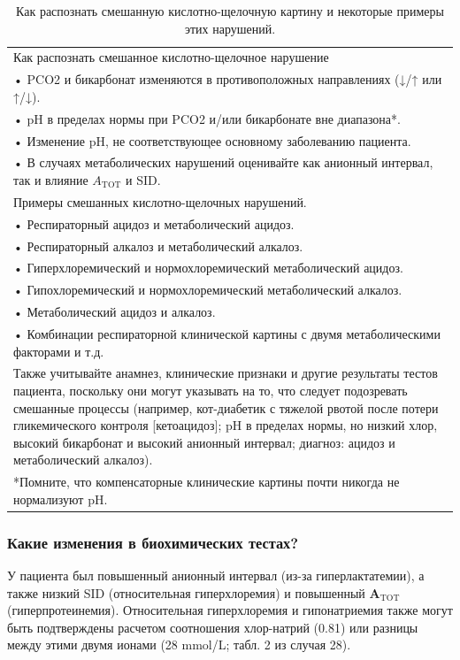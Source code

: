 \documentclass[a4paper,12pt]{book}
\begin{document}
\begin{table}[htbp]
\centering
\caption{Как распознать смешанную кислотно-щелочную картину и некоторые примеры этих нарушений.}
\begin{tabular}{p{14cm}}
\toprule
Как распознать смешанное кислотно-щелочное нарушение \\
• PCO2 и бикарбонат изменяются в противоположных направлениях (↓/↑ или ↑/↓). \\
• pH в пределах нормы при PCO2 и/или бикарбонате вне диапазона*. \\
• Изменение pH, не соответствующее основному заболеванию пациента. \\
• В случаях метаболических нарушений оценивайте как анионный интервал, так и влияние $A_{\mathrm{TOT}}$ и SID. \\
Примеры смешанных кислотно-щелочных нарушений. \\
• Респираторный ацидоз и метаболический ацидоз. \\
• Респираторный алкалоз и метаболический алкалоз. \\
• Гиперхлоремический и нормохлоремический метаболический ацидоз. \\
• Гипохлоремический и нормохлоремический метаболический алкалоз. \\
• Метаболический ацидоз и алкалоз. \\
• Комбинации респираторной клинической картины с двумя метаболическими факторами и т.д. \\
Также учитывайте анамнез, клинические признаки и другие результаты тестов пациента, поскольку они могут указывать на то, что следует подозревать смешанные процессы (например, кот-диабетик с тяжелой рвотой после потери гликемического контроля [кетоацидоз]; pH в пределах нормы, но низкий хлор, высокий бикарбонат и высокий анионный интервал; диагноз: ацидоз и метаболический алкалоз). \\
\bottomrule
\multicolumn{1}{l}{*Помните, что компенсаторные клинические картины почти никогда не нормализуют pH.}
\end{tabular}
\end{table}

\subsubsection*{Какие изменения в биохимических тестах?}
У пациента был повышенный анионный интервал (из-за гиперлактатемии), а также низкий SID (относительная гиперхлоремия) и повышенный $\mathbf{A}_{\mathrm{TOT}}$ (гиперпротеинемия). Относительная гиперхлоремия и гипонатриемия также могут быть подтверждены расчетом соотношения хлор-натрий (0.81) или разницы между этими двумя ионами (28 mmol/L; табл. 2 из случая 28).
\end{document}
